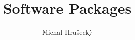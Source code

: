\documentclass{beamer}
\author{Michal Hru\v{s}eck\'{y}}
\title{Software Packages}
\institute{openSUSE Team}
\begin{document}
\titlepage





\end{document}
